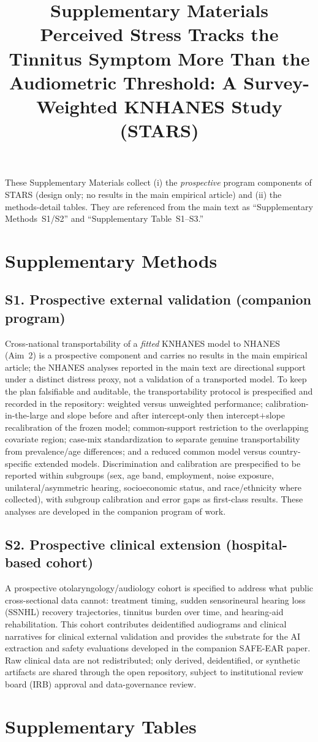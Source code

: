 \documentclass[12pt]{article}
\title{Supplementary Materials\\[2pt]
\large Perceived Stress Tracks the Tinnitus Symptom More Than the Audiometric
Threshold: A Survey-Weighted KNHANES Study (STARS)}
\author{}
\date{}
\begin{document}
\maketitle
\vspace{-3em}

\noindent These Supplementary Materials collect (i) the \emph{prospective} program
components of STARS (design only; no results in the main empirical article) and
(ii) the methods-detail tables. They are referenced from the main text as
``Supplementary Methods~S1/S2'' and ``Supplementary Table~S1--S3.''

\section*{Supplementary Methods}

\subsection*{S1. Prospective external validation (companion program)}
Cross-national transportability of a \emph{fitted} KNHANES model to NHANES
(Aim~2) is a prospective component and carries no results in the main empirical
article; the NHANES analyses reported in the main text are directional support
under a distinct distress proxy, not a validation of a transported model. To keep
the plan falsifiable and auditable, the transportability protocol is prespecified
and recorded in the repository: weighted versus unweighted performance;
calibration-in-the-large and slope before and after intercept-only then
intercept$+$slope recalibration of the frozen model; common-support restriction to
the overlapping covariate region; case-mix standardization to separate genuine
transportability from prevalence/age differences; and a reduced common model
versus country-specific extended models. Discrimination and calibration are
prespecified to be reported within subgroups (sex, age band, employment, noise
exposure, unilateral/asymmetric hearing, socioeconomic status, and race/ethnicity
where collected), with subgroup calibration and error gaps as first-class results.
These analyses are developed in the companion program of work.

\subsection*{S2. Prospective clinical extension (hospital-based cohort)}
A prospective otolaryngology/audiology cohort is specified to address what public
cross-sectional data cannot: treatment timing, sudden sensorineural hearing loss
(SSNHL) recovery trajectories, tinnitus burden over time, and hearing-aid
rehabilitation. This cohort contributes deidentified audiograms and clinical
narratives for clinical external validation and provides the substrate for the AI
extraction and safety evaluations developed in the companion SAFE-EAR paper. Raw
clinical data are not redistributed; only derived, deidentified, or synthetic
artifacts are shared through the open repository, subject to institutional review
board (IRB) approval and data-governance review.

\section*{Supplementary Tables}

\end{document}
